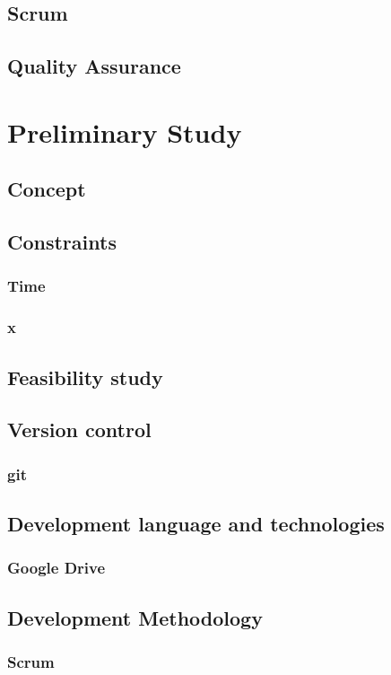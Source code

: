 \documentclass[10pt,a4paper,oneside]{report}
\begin{document}
\section{Scrum}
\section{Quality Assurance}

\chapter{Preliminary Study}
\section{Concept}
\section{Constraints}
\subsection{Time}
\subsection{x}
\section{Feasibility study}
\section{Version control}
\subsection{git}
\section{Development language and technologies}
\subsection{Google Drive}
\section{Development Methodology}
\subsection{Scrum}
\end{document}
